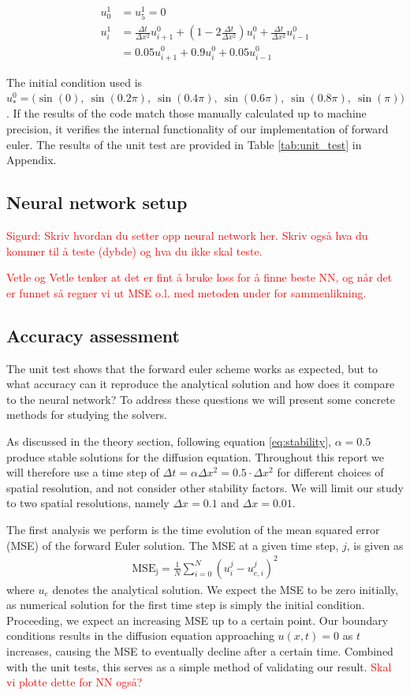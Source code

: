 \documentclass[12pt]{extarticle}
\begin{document}
\begin{align*}
	u_0^1 &= u_5^1 = 0 \\
	u_i^1 &= \frac{\Delta t}{\Delta x^2}u_{i+1}^0 + (1 - 2\frac{\Delta t}{\Delta x^2})u_i^0 + \frac{\Delta t}{\Delta x^2}u_{i-1}^0 \\
	&= 0.05u_{i+1}^0 + 0.9u_i^0 + 0.05u_{i-1}^0
\end{align*}

The initial condition used is $u_*^0 = \big(\sin(0),\:\sin(0.2\pi),\:\sin(0.4\pi),\:\sin(0.6\pi), \:\sin(0.8\pi),\:\sin(\pi)\big)$. If the results of the code match those manually calculated up to machine precision, it verifies the internal functionality of our implementation of forward euler. The results of the unit test are provided in Table \ref{tab:unit_test} in Appendix.



\subsection{Neural network setup}
\textcolor{red}{Sigurd: Skriv hvordan du setter opp neural network her. Skriv også hva du kommer til å teste (dybde) og hva du ikke skal teste.}

\textcolor{red}{Vetle og Vetle tenker at det er fint å bruke loss for å finne beste NN, og når det er funnet så regner vi ut MSE o.l. med metoden under for sammenlikning.}

\subsection{Accuracy assessment}
The unit test shows that the forward euler scheme works as expected, but to what accuracy can it reproduce the analytical solution and how does it compare to the neural network? To address these questions we will present some concrete methods for studying the solvers.

As discussed in the theory section, following equation \eqref{eq:stability}, $\alpha=0.5$ produce stable solutions for the diffusion equation. Throughout this report we will therefore use a time step of $\Delta t = \alpha \Delta x^2 = 0.5\cdot \Delta x^2$ for different choices of spatial resolution, and not consider other stability factors. We will limit our study to two spatial resolutions, namely $\Delta x = 0.1$ and $\Delta x = 0.01$.  

The first analysis we perform is the time evolution of the mean squared error (MSE) of the forward Euler solution. The MSE at a given time step, $j$, is given as 
\begin{align} \label{eq:MSE}
	\mathrm{MSE_j} = \frac{1}{N}\sum_{i=0}^N (u_i^j - u_{e,i}^j)^2 
\end{align}
where $u_e$ denotes the analytical solution. We expect the MSE to be zero initially, as numerical solution for the first time step is simply the initial condition. Proceeding, we expect an increasing MSE up to a certain point. Our boundary conditions results in the diffusion equation approaching $u(x,t)=0$ as $t$ increases, causing the MSE to eventually decline after a certain time. Combined with the unit tests, this serves as a simple method of validating our result.  
\textcolor{red}{Skal vi plotte dette for NN også?}
\end{document}
